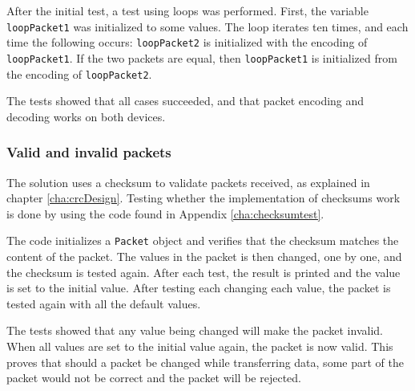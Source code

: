 After the initial test, a test using loops was performed. First, the variable  \texttt{loopPacket1} was initialized to some values. The loop iterates ten times, and each time the following occurs: \texttt{loopPacket2} is initialized with the encoding of \texttt{loopPacket1}. If the two packets are equal, then \texttt{loopPacket1} is initialized from the encoding of \texttt{loopPacket2}. 

The tests showed that all cases succeeded, and that packet encoding and decoding works on both devices.

\subsubsection*{Valid and invalid packets}
The solution uses a checksum to validate packets received, as explained in chapter \ref{cha:crcDesign}. Testing whether the implementation of checksums work is done by using the code found in Appendix \ref{cha:checksumtest}.

The code initializes a \texttt{Packet} object and verifies that the checksum matches the content of the packet. The values in the packet is then changed, one by one, and the checksum is tested again. After each test, the result is printed and the value is set to the initial value. After testing each changing each value, the packet is tested again with all the default values.

The tests showed that any value being changed will make the packet invalid. When all values are set to the initial value again, the packet is now valid.
This proves that should a packet be changed while transferring data, some part of the packet would not be correct and the packet will be rejected.

